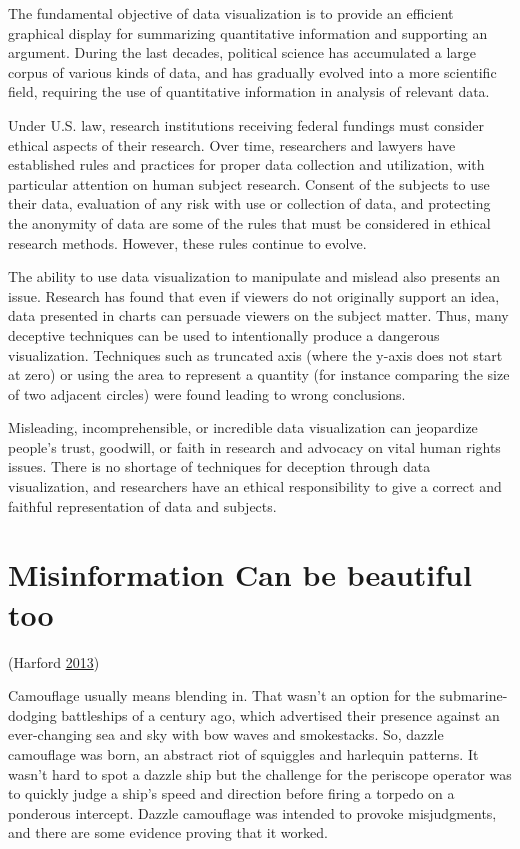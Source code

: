 \documentclass[]{book}
\begin{document}
The fundamental objective of data visualization is to provide an efficient graphical display for summarizing quantitative information and supporting an argument. During the last decades, political science has accumulated a large corpus of various kinds of data, and has gradually evolved into a more scientific field, requiring the use of quantitative information in analysis of relevant data.

Under U.S. law, research institutions receiving federal fundings must consider ethical aspects of their research. Over time, researchers and lawyers have established rules and practices for proper data collection and utilization, with particular attention on human subject research. Consent of the subjects to use their data, evaluation of any risk with use or collection of data, and protecting the anonymity of data are some of the rules that must be considered in ethical research methods. However, these rules continue to evolve.

The ability to use data visualization to manipulate and mislead also presents an issue. Research has found that even if viewers do not originally support an idea, data presented in charts can persuade viewers on the subject matter. Thus, many deceptive techniques can be used to intentionally produce a dangerous visualization. Techniques such as truncated axis (where the y-axis does not start at zero) or using the area to represent a quantity (for instance comparing the size of two adjacent circles) were found leading to wrong conclusions.

Misleading, incomprehensible, or incredible data visualization can jeopardize people's trust, goodwill, or faith in research and advocacy on vital human rights issues. There is no shortage of techniques for deception through data visualization, and researchers have an ethical responsibility to give a correct and faithful representation of data and subjects.

\hypertarget{misinformation-can-be-beautiful-too}{%
\section{Misinformation Can be beautiful too}\label{misinformation-can-be-beautiful-too}}

(Harford \protect\hyperlink{ref-harford-misinformation}{2013})

Camouflage usually means blending in. That wasn't an option for the submarine-dodging battleships of a century ago, which advertised their presence against an ever-changing sea and sky with bow waves and smokestacks. So, dazzle camouflage was born, an abstract riot of squiggles and harlequin patterns. It wasn't hard to spot a dazzle ship but the challenge for the periscope operator was to quickly judge a ship's speed and direction before firing a torpedo on a ponderous intercept. Dazzle camouflage was intended to provoke misjudgments, and there are some evidence proving that it worked.
\end{document}
